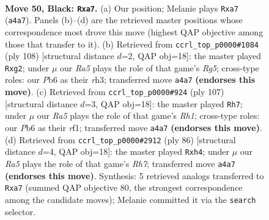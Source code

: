 \documentclass[11pt]{article}
\begin{document}
\clearpage

\begin{figure}[p]\centering
\begin{subfigure}{0.46\textwidth}\centering
\resizebox{\linewidth}{!}{%
\newchessgame
\chessboard[
  setfen={8/P7/1p4k1/8/r7/7K/8/8 b - - 2 50},
  showmover=false,
  pgfstyle=straightmove, color=movearrow, markmove={a4-a7}
]}
\caption{}
\end{subfigure}\hfill
\begin{subfigure}{0.46\textwidth}\centering
\resizebox{\linewidth}{!}{%
\newchessgame
\chessboard[
  setfen={3k4/8/1K6/6R1/2P5/7r/6p1/8 w - - 0 55},
  showmover=false,
  pgfstyle=straightmove, color=movearrow, markmove={g5-g2}
]}
\caption{}
\end{subfigure}
\\[4pt]
\begin{subfigure}{0.46\textwidth}\centering
\resizebox{\linewidth}{!}{%
\newchessgame
\chessboard[
  setfen={7r/8/4k3/7P/8/2K5/8/5R2 b - - 8 54},
  showmover=false,
  pgfstyle=straightmove, color=movearrow, markmove={h8-h7}
]}
\caption{}
\end{subfigure}\hfill
\begin{subfigure}{0.46\textwidth}\centering
\resizebox{\linewidth}{!}{%
\newchessgame
\chessboard[
  setfen={5r2/7R/8/3k4/7p/8/3K2P1/8 w - - 5 44},
  showmover=false,
  pgfstyle=straightmove, color=movearrow, markmove={h7-h4}
]}
\caption{}
\end{subfigure}
\caption{\textbf{Move 50, Black: \texttt{Rxa7}.} (a) Our position; Melanie plays \texttt{Rxa7} (\texttt{a4a7}). Panels (b)--(d) are the retrieved master positions whose correspondence most drove this move (highest QAP objective among those that transfer to it). (b) Retrieved from \texttt{ccrl\_top\_p0000\#1084} (ply 108) [structural distance $d$=2, QAP obj=18]: the master played \texttt{Rxg2}; under $\mu$ our \emph{Ra5} plays the role of that game's \emph{Rg5}; cross-type roles: our \emph{P}b6 as their \emph{r}h3; transferred move \texttt{a4a7} \textbf{(endorses this move)}. (c) Retrieved from \texttt{ccrl\_top\_p0000\#924} (ply 107) [structural distance $d$=3, QAP obj=18]: the master played \texttt{Rh7}; under $\mu$ our \emph{Ra5} plays the role of that game's \emph{Rh1}; cross-type roles: our \emph{P}b6 as their \emph{r}f1; transferred move \texttt{a4a7} \textbf{(endorses this move)}. (d) Retrieved from \texttt{ccrl\_top\_p0000\#2912} (ply 86) [structural distance $d$=4, QAP obj=18]: the master played \texttt{Rxh4}; under $\mu$ our \emph{Ra5} plays the role of that game's \emph{Rh7}; transferred move \texttt{a4a7} \textbf{(endorses this move)}. Synthesis: 5 retrieved analogs transferred to \texttt{Rxa7} (summed QAP objective 80, the strongest correspondence among the candidate moves); Melanie committed it via the \texttt{search} selector.}
\label{fig:thought-m99}
\end{figure}
\end{document}
